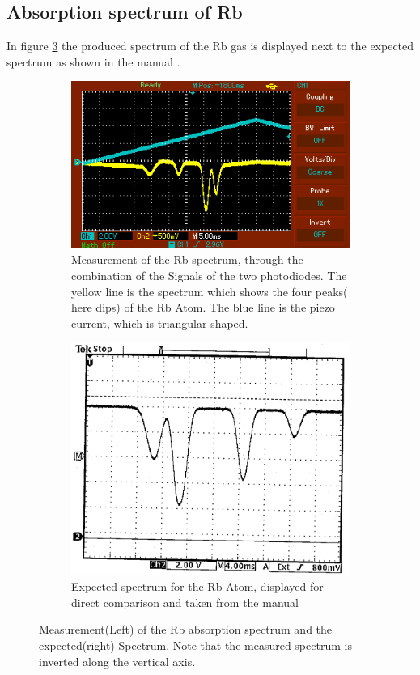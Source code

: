 \subsection{Absorption spectrum of Rb}
In figure \ref{fig:spectrum} the produced spectrum of the Rb gas is displayed next to the expected spectrum as shown in the manual \cite{sample}.
\begin{figure}
    \centering
    \begin{subfigure}{.5\textwidth}
      \centering
      \includegraphics[width=0.9\linewidth]{Bilder/V60_Bilder/spectrum.png}
      \caption{ Measurement of the Rb spectrum, through the combination of the Signals of the two photodiodes. The yellow line is the spectrum which shows the four peaks( here dips) of the Rb Atom. The blue line is the piezo current, which is triangular shaped.    }
      \label{fig:sub1}
    \end{subfigure}%
    \begin{subfigure}{.5\textwidth}
      \centering
      \includegraphics[width=.9\linewidth]{Bilder/exp_spectrum.png}
      \caption{Expected spectrum for the Rb Atom, displayed for direct comparison and taken from the manual \cite{sample} }
      \label{fig:sub2}
    \end{subfigure}
    \caption{ Measurement(Left) of the Rb absorption spectrum and the expected(right) Spectrum. Note that the measured spectrum is inverted along the vertical axis. }
    \label{fig:spectrum}
 \end{figure}
